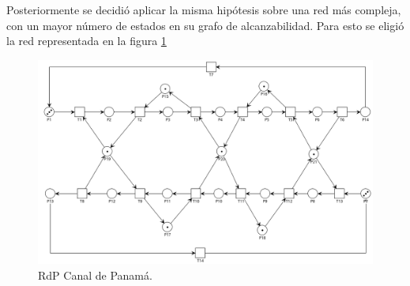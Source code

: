 \bigskip
Posteriormente se decidió aplicar la misma hipótesis sobre una red más compleja, con un mayor número de estados en su grafo de alcanzabilidad. Para esto se eligió la red representada en la figura \ref{fig:panama}

\begin{figure}[H]
	\centering
    \includegraphics[width=\textwidth]{Figures/algoritmo1/panama.png}
    \caption[RdP Canal de Panamá.]{RdP Canal de Panamá. \footnotemark}
	\label{fig:panama}
 \end{figure} 

